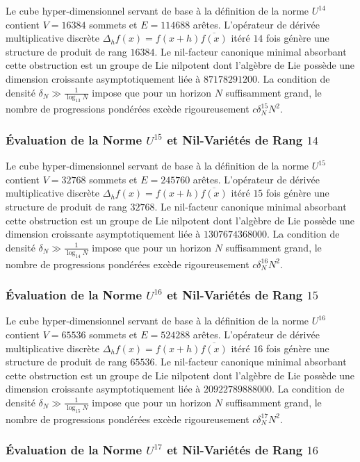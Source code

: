 \documentclass[11pt,a4paper]{article}
\begin{document}
Le cube hyper-dimensionnel servant de base à la définition de la norme $U^{14}$ contient $V = 16384$ sommets et $E = 114688$ arêtes. L'opérateur de dérivée multiplicative discrète $\Delta_h f(x) = f(x+h)\overline{f(x)}$ itéré $14$ fois génère une structure de produit de rang $16384$. Le nil-facteur canonique minimal absorbant cette obstruction est un groupe de Lie nilpotent dont l'algèbre de Lie possède une dimension croissante asymptotiquement liée à $87178291200$. La condition de densité $\delta_N \gg \frac{1}{\log_{13} N}$ impose que pour un horizon $N$ suffisamment grand, le nombre de progressions pondérées excède rigoureusement $c \delta_N^{15} N^2$. \subsubsection{Évaluation de la Norme $U^{15}$ et Nil-Variétés de Rang $14$}
Le cube hyper-dimensionnel servant de base à la définition de la norme $U^{15}$ contient $V = 32768$ sommets et $E = 245760$ arêtes. L'opérateur de dérivée multiplicative discrète $\Delta_h f(x) = f(x+h)\overline{f(x)}$ itéré $15$ fois génère une structure de produit de rang $32768$. Le nil-facteur canonique minimal absorbant cette obstruction est un groupe de Lie nilpotent dont l'algèbre de Lie possède une dimension croissante asymptotiquement liée à $1307674368000$. La condition de densité $\delta_N \gg \frac{1}{\log_{14} N}$ impose que pour un horizon $N$ suffisamment grand, le nombre de progressions pondérées excède rigoureusement $c \delta_N^{16} N^2$. \subsubsection{Évaluation de la Norme $U^{16}$ et Nil-Variétés de Rang $15$}
Le cube hyper-dimensionnel servant de base à la définition de la norme $U^{16}$ contient $V = 65536$ sommets et $E = 524288$ arêtes. L'opérateur de dérivée multiplicative discrète $\Delta_h f(x) = f(x+h)\overline{f(x)}$ itéré $16$ fois génère une structure de produit de rang $65536$. Le nil-facteur canonique minimal absorbant cette obstruction est un groupe de Lie nilpotent dont l'algèbre de Lie possède une dimension croissante asymptotiquement liée à $20922789888000$. La condition de densité $\delta_N \gg \frac{1}{\log_{15} N}$ impose que pour un horizon $N$ suffisamment grand, le nombre de progressions pondérées excède rigoureusement $c \delta_N^{17} N^2$. \subsubsection{Évaluation de la Norme $U^{17}$ et Nil-Variétés de Rang $16$}
\end{document}
